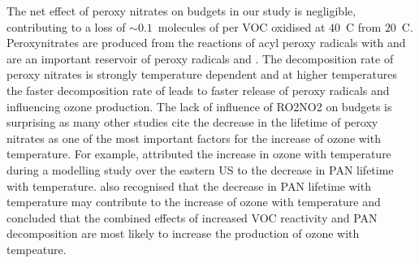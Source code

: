 The net effect of peroxy nitrates on  budgets in our study is negligible, contributing to a loss of $\sim0.1$~molecules of  per VOC oxidised at $40$~\degree C from $20$~\degree C.
Peroxynitrates are produced from the reactions of acyl peroxy radicals with  and are an important reservoir of peroxy radicals and .
The decomposition rate of peroxy nitrates is strongly temperature dependent and at higher temperatures the faster decomposition rate of  leads to faster release of peroxy radicals and  influencing ozone production.
The lack of influence of RO2NO2 on  budgets is surprising as many other studies cite the decrease in the lifetime of peroxy nitrates as one of the most important factors for the increase of ozone with temperature.
For example, \citet{Dawson:2007} attributed the increase in ozone with temperature during a modelling study over the eastern US to the decrease in PAN lifetime with temperature.
\citet{Steiner:2006} also recognised that the decrease in PAN lifetime with temperature may contribute to the increase of ozone with temperature and concluded that the combined effects of increased VOC reactivity and PAN decomposition are most likely to increase the production of ozone with tempeature.

